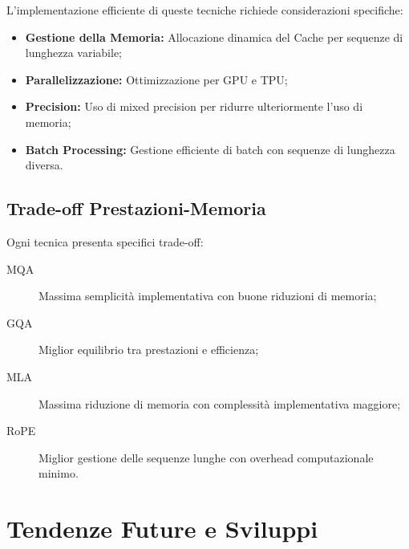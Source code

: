 L'implementazione efficiente di queste tecniche richiede considerazioni specifiche:

\begin{itemize}
    \item \textbf{Gestione della Memoria:} Allocazione dinamica del Cache per sequenze di lunghezza variabile;
    \item \textbf{Parallelizzazione:} Ottimizzazione per GPU e TPU;
    \item \textbf{Precision:} Uso di mixed precision per ridurre ulteriormente l'uso di memoria;
    \item \textbf{Batch Processing:} Gestione efficiente di batch con sequenze di lunghezza diversa.
\end{itemize}

\subsection{Trade-off Prestazioni-Memoria}
Ogni tecnica presenta specifici trade-off:

\begin{description}
    \item[MQA] Massima semplicità implementativa con buone riduzioni di memoria;
    \item[GQA] Miglior equilibrio tra prestazioni e efficienza;
    \item[MLA] Massima riduzione di memoria con complessità implementativa maggiore;
    \item[RoPE] Miglior gestione delle sequenze lunghe con overhead computazionale minimo.
\end{description}

\section{Tendenze Future e Sviluppi}


